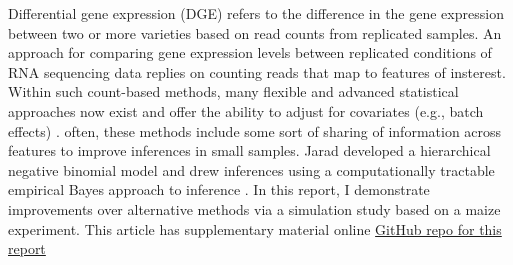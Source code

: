 Differential gene expression (DGE) refers to the difference in the gene expression between two or more varieties based on read counts from replicated samples. An approach for comparing gene expression levels between replicated conditions of RNA sequencing data replies on counting reads that map to features of insterest. Within such count-based methods, many flexible and advanced statistical approaches now exist and offer the ability to adjust for covariates (e.g., batch effects) \cite{zhou2014robustly}. often, these methods include some sort of sharing of information across features to improve inferences in small samples. Jarad developed a hierarchical negative binomial model and drew inferences using a computationally tractable empirical Bayes approach to inference \cite{niemi2015empirical}. In this report, I demonstrate improvements over alternative methods via a simulation study based on a maize experiment. This article has supplementary material online \href{https://github.com/jarad/eBayes_differential_expression}{GitHub repo for this report} 